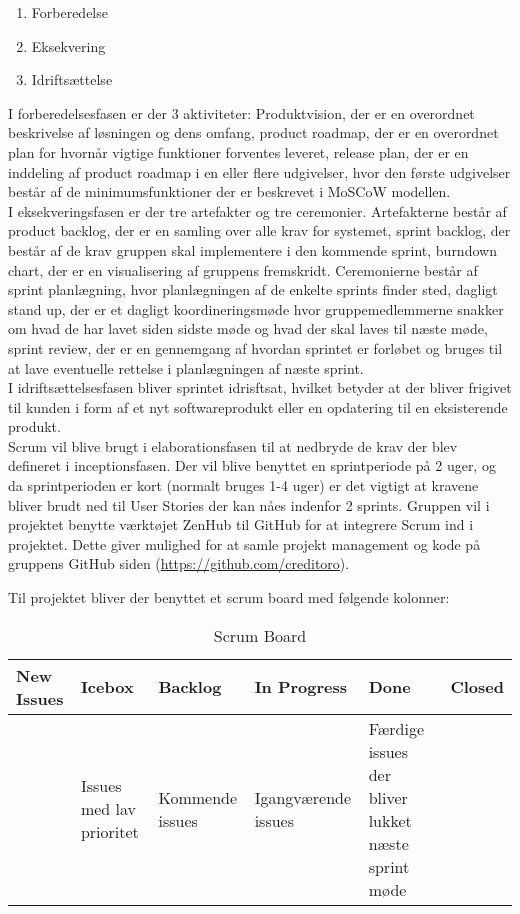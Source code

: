 \begin{enumerate}
    \item Forberedelse
    \item Eksekvering
    \item Idriftsættelse
\end{enumerate}


I forberedelsesfasen er der 3 aktiviteter: Produktvision, der er en overordnet beskrivelse af løsningen og dens omfang, product roadmap, der er en overordnet plan for hvornår vigtige funktioner forventes leveret, release plan, der er en inddeling af product roadmap i en eller flere udgivelser, hvor den første udgivelser består af de minimumsfunktioner der er beskrevet i MoSCoW modellen.\\


I eksekveringsfasen er der tre artefakter og tre ceremonier. Artefakterne består af product backlog, der er en samling over alle krav for systemet, sprint backlog, der består af de krav gruppen skal implementere i den kommende sprint, burndown chart, der er en visualisering af gruppens fremskridt. Ceremonierne består af sprint planlægning, hvor planlægningen af de enkelte sprints finder sted, dagligt stand up, der er et dagligt koordineringsmøde hvor gruppemedlemmerne snakker om hvad de har lavet siden sidste møde og hvad der skal laves til næste møde, sprint review, der er en gennemgang af hvordan sprintet er forløbet og bruges til at lave eventuelle rettelse i planlægningen af næste sprint. \\


I idriftsættelsesfasen bliver sprintet idrisftsat, hvilket betyder at der bliver frigivet til kunden i form af et nyt softwareprodukt eller en opdatering til en eksisterende produkt.\\


Scrum vil blive brugt i elaborationsfasen til at nedbryde de krav der blev defineret i inceptionsfasen. Der vil blive benyttet en sprintperiode på 2 uger, og da sprintperioden er kort (normalt bruges 1-4 uger) er det vigtigt at kravene bliver brudt ned til User Stories der kan nåes indenfor 2 sprints.
Gruppen vil i projektet benytte værktøjet ZenHub til GitHub for at integrere Scrum ind i projektet. Dette giver mulighed for at samle projekt management og kode på gruppens GitHub siden (\url{https://github.com/creditoro}).

Til projektet bliver der benyttet et scrum board med følgende kolonner:\\

\begin{table}[ht]
    \begin{tabularx}{\textwidth}{|>{\RaggedRight}X|>{\RaggedRight}X|>{\RaggedRight}X|>{\RaggedRight}X|>{\RaggedRight}X|>{\RaggedRight}X|}
    \hline
    \textbf{New Issues} & \textbf{Icebox} & \textbf{Backlog} & \textbf{In Progress} & \textbf{Done} & \textbf{Closed} \\ \hline
     & Issues med lav prioritet & Kommende issues & Igangværende issues & Færdige issues der bliver lukket næste sprint møde & \\ \hline
    \end{tabularx}
    \caption{Scrum Board}
    \label{tab:scrumboard}
\end{table} 

